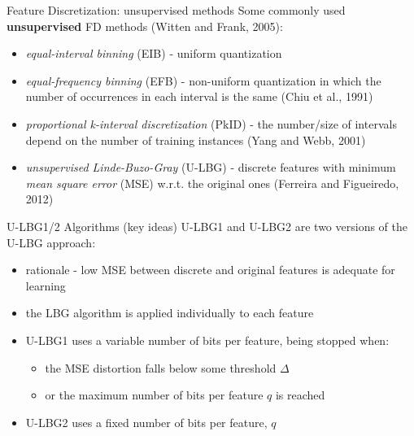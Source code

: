 \documentclass{beamer}
\begin{document}
\begin{frame}{Feature Discretization: unsupervised methods}
Some commonly used \textbf{unsupervised} FD methods (Witten and Frank, 2005):
\begin{itemize}
	\vfill
	\item \emph{equal-interval binning} (EIB) - uniform quantization 		
	
  \vfill
	\item \emph{equal-frequency binning} (EFB) - non-uniform quantization in which the number of
	occurrences in each interval is the same (Chiu et al., 1991)
	
	\vfill
	\item \emph{proportional k-interval discretization} (PkID) -
	the number/size of intervals depend on the number of training instances
(Yang and Webb, 2001)

  \vfill
	\item \emph{unsupervised Linde-Buzo-Gray} (U-LBG) - discrete features with minimum \emph{mean square error} (MSE)
	w.r.t. the original ones (Ferreira and Figueiredo, 2012)
\end{itemize}
\end{frame}


\begin{frame}{U-LBG1/2 Algorithms (key ideas)}
U-LBG1 and U-LBG2 are two versions of the U-LBG approach:
\begin{itemize}
	\vfill
	\item rationale - low MSE between discrete and original features is adequate for learning
	
	\vfill
	\item the LBG algorithm is applied individually to each feature
	
	\vfill
	\item U-LBG1 uses a variable number of bits per feature, being stopped when:
	\begin{itemize}
		 \item the MSE distortion falls below some threshold $\Delta$
		 \item or the maximum number of bits per feature $q$ is reached
	\end{itemize}

  \vfill
  \item U-LBG2 uses a fixed number of bits per feature, $q$
\end{itemize}
\end{frame}
\end{document}
